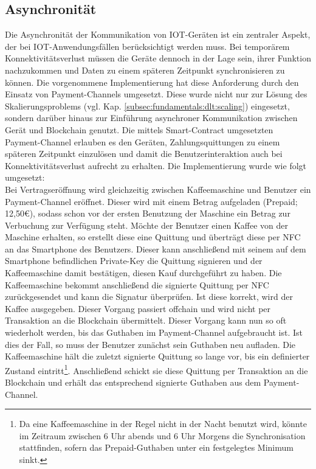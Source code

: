 \subsection{Asynchronität}
\label{subsec:implementation:requirements:async}
Die Asynchronität der Kommunikation von \ac{IOT}-Geräten ist ein zentraler Aspekt, der bei \ac{IOT}-Anwendungsfällen berücksichtigt werden muss. Bei temporärem Konnektivitätsverlust müssen die Geräte dennoch in der Lage sein, ihrer Funktion nachzukommen und Daten zu einem späteren Zeitpunkt synchronisieren zu können. Die vorgenommene Implementierung hat diese Anforderung durch den Einsatz von Payment-Channels umgesetzt. Diese wurde nicht nur zur Lösung des Skalierungsproblems (vgl. Kap. \ref{subsec:fundamentals:dlt:scaling}) eingesetzt, sondern darüber hinaus zur Einführung asynchroner Kommunikation zwischen Gerät und Blockchain genutzt. Die mittels Smart-Contract umgesetzten Payment-Channel erlauben es den Geräten, Zahlungsquittungen zu einem späteren Zeitpunkt einzulösen und damit die Benutzerinteraktion auch bei Konnektivitätsverlust aufrecht zu erhalten. Die Implementierung wurde wie folgt umgesetzt:\\
Bei Vertragseröffnung wird gleichzeitig zwischen Kaffeemaschine und Benutzer ein Payment-Channel eröffnet. Dieser wird mit einem Betrag aufgeladen (Prepaid; 12,50€), sodass schon vor der ersten Benutzung der Maschine ein Betrag zur Verbuchung zur Verfügung steht. Möchte der Benutzer einen Kaffee von der Maschine erhalten, so erstellt diese eine Quittung und überträgt diese per \ac{NFC} an das Smartphone des Benutzers. Dieser kann anschließend mit seinem auf dem Smartphone befindlichen Private-Key die Quittung signieren und der Kaffeemaschine damit bestätigen, diesen Kauf durchgeführt zu haben. Die Kaffeemaschine bekommt anschließend die signierte Quittung per \ac{NFC} zurückgesendet und kann die Signatur überprüfen. Ist diese korrekt, wird der Kaffee ausgegeben. Dieser Vorgang passiert offchain und wird nicht per Transaktion an die Blockchain übermittelt. Dieser Vorgang kann nun so oft wiederholt werden, bis das Guthaben im Payment-Channel aufgebraucht ist. Ist dies der Fall, so muss der Benutzer zunächst sein Guthaben neu aufladen. Die Kaffeemaschine hält die zuletzt signierte Quittung so lange vor, bis ein definierter Zustand eintritt\footnote{Da eine Kaffeemaschine in der Regel nicht in der Nacht benutzt wird, könnte im Zeitraum zwischen 6 Uhr abends und 6 Uhr Morgens die Synchronisation stattfinden, sofern das Prepaid-Guthaben unter ein festgelegtes Minimum sinkt.}. Anschließend schickt sie diese Quittung per Transaktion an die Blockchain und erhält das entsprechend signierte Guthaben aus dem Payment-Channel.


